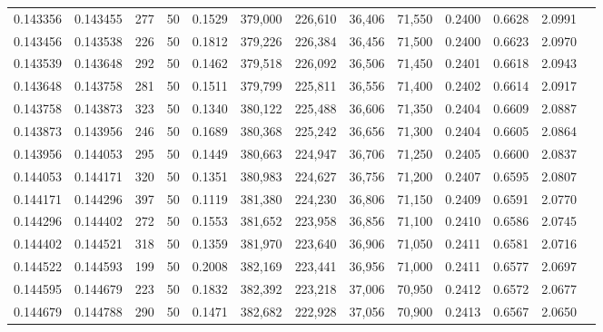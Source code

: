 \begin{tabular}{rrrrrrrrrrrrr}
0.143356 & 0.143455 &   277 &  50 &                                     0.1529 & 379,000 & 226,610 &  36,406 &  71,550 & 0.2400 & 0.6628 & 2.0991 \\
0.143456 & 0.143538 &   226 &  50 &                                     0.1812 & 379,226 & 226,384 &  36,456 &  71,500 & 0.2400 & 0.6623 & 2.0970 \\
0.143539 & 0.143648 &   292 &  50 &                                     0.1462 & 379,518 & 226,092 &  36,506 &  71,450 & 0.2401 & 0.6618 & 2.0943 \\
0.143648 & 0.143758 &   281 &  50 &                                     0.1511 & 379,799 & 225,811 &  36,556 &  71,400 & 0.2402 & 0.6614 & 2.0917 \\
0.143758 & 0.143873 &   323 &  50 &                                     0.1340 & 380,122 & 225,488 &  36,606 &  71,350 & 0.2404 & 0.6609 & 2.0887 \\
0.143873 & 0.143956 &   246 &  50 &                                     0.1689 & 380,368 & 225,242 &  36,656 &  71,300 & 0.2404 & 0.6605 & 2.0864 \\
0.143956 & 0.144053 &   295 &  50 &                                     0.1449 & 380,663 & 224,947 &  36,706 &  71,250 & 0.2405 & 0.6600 & 2.0837 \\
0.144053 & 0.144171 &   320 &  50 &                                     0.1351 & 380,983 & 224,627 &  36,756 &  71,200 & 0.2407 & 0.6595 & 2.0807 \\
0.144171 & 0.144296 &   397 &  50 &                                     0.1119 & 381,380 & 224,230 &  36,806 &  71,150 & 0.2409 & 0.6591 & 2.0770 \\
0.144296 & 0.144402 &   272 &  50 &                                     0.1553 & 381,652 & 223,958 &  36,856 &  71,100 & 0.2410 & 0.6586 & 2.0745 \\
0.144402 & 0.144521 &   318 &  50 &                                     0.1359 & 381,970 & 223,640 &  36,906 &  71,050 & 0.2411 & 0.6581 & 2.0716 \\
0.144522 & 0.144593 &   199 &  50 &                                     0.2008 & 382,169 & 223,441 &  36,956 &  71,000 & 0.2411 & 0.6577 & 2.0697 \\
0.144595 & 0.144679 &   223 &  50 &                                     0.1832 & 382,392 & 223,218 &  37,006 &  70,950 & 0.2412 & 0.6572 & 2.0677 \\
0.144679 & 0.144788 &   290 &  50 &                                     0.1471 & 382,682 & 222,928 &  37,056 &  70,900 & 0.2413 & 0.6567 & 2.0650 \\

\end{tabular}
